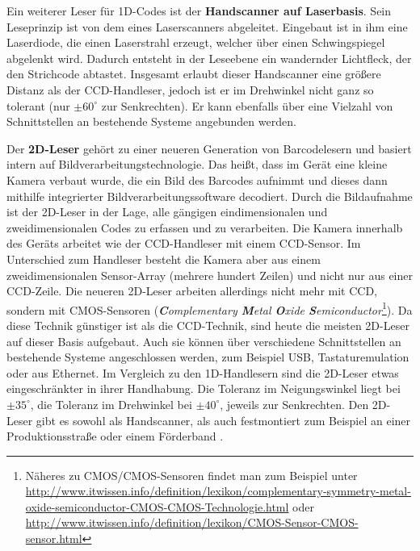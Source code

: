 Ein weiterer Leser für 1D-Codes ist der \textbf{Handscanner auf Laserbasis}. Sein Leseprinzip ist von dem eines Laserscanners abgeleitet. Eingebaut ist in ihm eine Laserdiode, die einen Laserstrahl erzeugt, welcher über einen Schwingspiegel abgelenkt wird. Dadurch entsteht in der Leseebene ein wandernder Lichtfleck, der den Strichcode abtastet. Insgesamt erlaubt dieser Handscanner eine größere Distanz als der CCD-Handleser, jedoch ist er im Drehwinkel nicht ganz so tolerant (nur $\pm60^\circ$ zur Senkrechten). Er kann ebenfalls über eine Vielzahl von Schnittstellen an bestehende Systeme angebunden werden.

Der \textbf{2D-Leser} gehört zu einer neueren Generation von Barcodelesern und basiert intern auf Bildverarbeitungstechnologie. Das heißt, dass im Gerät eine kleine Kamera verbaut wurde, die ein Bild des Barcodes aufnimmt und dieses dann mithilfe integrierter Bildverarbeitungssoftware decodiert. Durch die Bildaufnahme ist der 2D-Leser in der Lage, alle gängigen eindimensionalen und zweidimensionalen Codes zu erfassen und zu verarbeiten. Die Kamera innerhalb des Geräts arbeitet wie der CCD-Handleser mit einem CCD-Sensor. Im Unterschied zum Handleser besteht die Kamera aber aus einem zweidimensionalen Sensor-Array (mehrere hundert Zeilen) und nicht nur aus einer CCD-Zeile. 
Die neueren 2D-Leser arbeiten allerdings nicht mehr mit CCD, sondern mit CMOS-Sensoren (\textit{\textbf{C}omplementary \textbf{M}etal \textbf{O}xide \textbf{S}emiconductor}\footnote{Näheres zu CMOS/CMOS-Sensoren findet man zum Beispiel unter \url{http://www.itwissen.info/definition/lexikon/complementary-symmetry-metal-oxide-semiconductor-CMOS-CMOS-Technologie.html} oder \url{http://www.itwissen.info/definition/lexikon/CMOS-Sensor-CMOS-sensor.html}}). Da diese Technik günstiger ist als die CCD-Technik, sind heute die meisten 2D-Leser auf dieser Basis aufgebaut. Auch sie können über verschiedene Schnittstellen an bestehende Systeme angeschlossen werden, zum Beispiel USB, Tastaturemulation oder aus Ethernet. Im Vergleich zu den 1D-Handlesern sind die 2D-Leser etwas eingeschränkter in ihrer Handhabung. Die Toleranz im Neigungswinkel liegt bei $\pm35^\circ$, die Toleranz im Drehwinkel bei $\pm40^\circ$, jeweils zur Senkrechten. Den 2D-Leser gibt es sowohl als Handscanner, als auch festmontiert zum Beispiel an einer Produktionsstraße oder einem Förderband \cite{DatalogicScanning2007}.   

